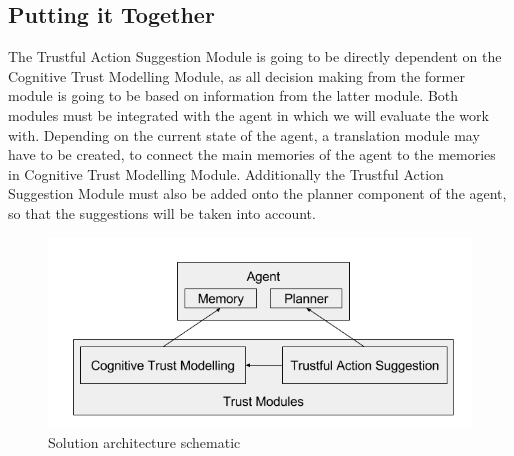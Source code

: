 \subsection{Putting it Together}
\label{subsec:Solution:Putting it Together}
The Trustful Action Suggestion Module is going to be directly dependent on the Cognitive Trust Modelling Module, as all decision making from the former module is going to be based on information from the latter module.
Both modules must be integrated with the agent in which we will evaluate the work with. Depending on the current state of the agent, a translation module may have to be created, to connect the main memories of the agent to the memories in Cognitive Trust Modelling Module. Additionally the Trustful Action Suggestion Module must also be added onto the planner component of the agent, so that the suggestions will be taken into account.


\begin{figure}[hbt]
	\centering
	\includegraphics[width=\textwidth]{figures/arquitecture.png}
	\caption{Solution architecture schematic}
	\label{fig:arquitecture}
\end{figure}
